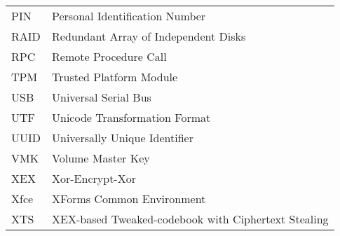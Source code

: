 \begin{longtable}{ll}
  PIN & Personal Identification Number \\
  RAID & Redundant Array of Independent Disks \\
  RPC & Remote Procedure Call \\
  TPM & Trusted Platform Module \\
  USB & Universal Serial Bus \\
  UTF & Unicode Transformation Format \\
  UUID & Universally Unique Identifier \\
  VMK & Volume Master Key \\
  XEX & Xor-Encrypt-Xor \\
  Xfce & XForms Common Environment \\
  XTS & XEX-based Tweaked-codebook with Ciphertext Stealing \\
\end{longtable}

